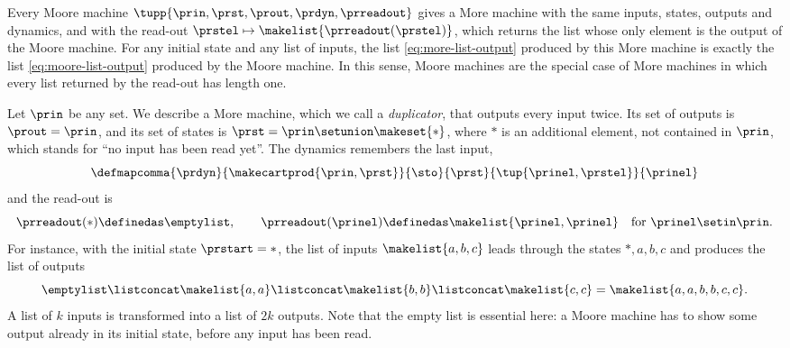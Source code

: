 \begin{remark}
    \label{rem:moore-as-more}
    Every Moore machine $\tupp{\prin,\prst,\prout,\prdyn,\prreadout}$ gives a More machine with the same inputs, states, outputs and dynamics, and with the read-out $\prstel \mapsto \makelist{\prreadout(\prstel)}$, which returns the list whose only element is the output of the Moore machine.
    For any initial state and any list of inputs, the list \cref{eq:more-list-output} produced by this More machine is exactly the list \cref{eq:moore-list-output} produced by the Moore machine.
    In this sense, Moore machines are the special case of More machines in which every list returned by the read-out has length one.
\end{remark}

\begin{example}[Duplicator]
    \label{exa:more-duplicator}
    Let $\prin$ be any set.
    We describe a More machine, which we call a \emph{duplicator}, that outputs every input twice.
    Its set of outputs is $\prout = \prin$, and its set of states is $\prst = \prin \setunion \makeset{\ast}$, where $\ast$ is an additional element, not contained in $\prin$, which stands for ``no input has been read yet''.
    The dynamics remembers the last input,
    \begin{equation}
        \defmapcomma{\prdyn}
        {\makecartprod{\prin, \prst}}
        {\sto}
        {\prst}
        {\tup{\prinel, \prstel}}
        {\prinel}
    \end{equation}
    and the read-out is
    \begin{equation}
        \prreadout(\ast) \definedas \emptylist,
        \qquad
        \prreadout(\prinel) \definedas \makelist{\prinel, \prinel} \quad \text{for } \prinel \setin \prin.
    \end{equation}
    For instance, with the initial state $\prstart = \ast$, the list of inputs $\makelist{a, b, c}$ leads through the states $\ast, a, b, c$ and produces the list of outputs
    \begin{equation*}
        \emptylist \listconcat \makelist{a, a} \listconcat \makelist{b, b} \listconcat \makelist{c, c} = \makelist{a, a, b, b, c, c}.
    \end{equation*}
    A list of $k$ inputs is transformed into a list of $2k$ outputs.
    Note that the empty list is essential here: a Moore machine has to show some output already in its initial state, before any input has been read.
\end{example}

